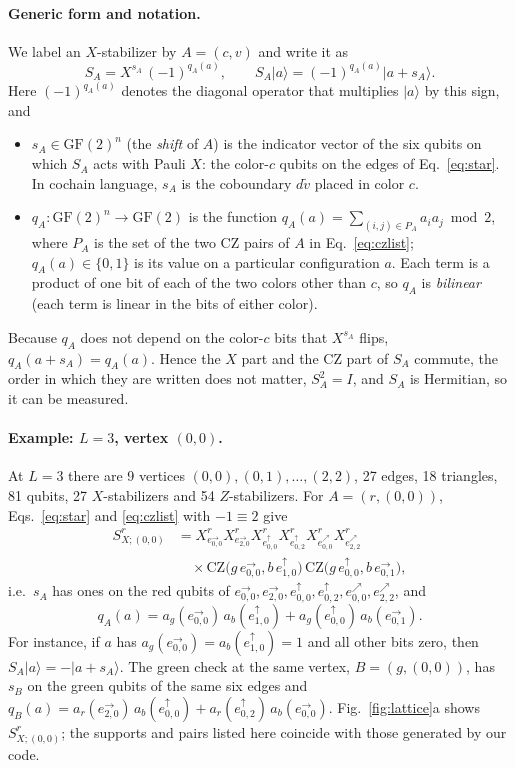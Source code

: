 \documentclass[a4paper]{article}
\newcommand{\rd}{r}
\newcommand{\gr}{g}
\newcommand{\bl}{b}
\newcommand{\GF}{\mathrm{GF}(2)}
\providecommand{\ket}[1]{\ensuremath{|#1\rangle}}
\newcommand{\eh}[1]{e^{\rightarrow}_{#1}}   %
\newcommand{\ev}[1]{e^{\uparrow}_{#1}}      %
\newcommand{\ed}[1]{e^{\nearrow}_{#1}}      %
\begin{document}
\paragraph{Generic form and notation.}
We label an $X$-stabilizer by $A=(c,v)$ and write it as
\begin{equation}
  S_A=X^{s_A}\,(-1)^{q_A(a)},\qquad S_A\ket{a}=(-1)^{q_A(a)}\ket{a+s_A}.
  \label{eq:generic}
\end{equation}
Here $(-1)^{q_A(a)}$ denotes the diagonal operator that multiplies $\ket{a}$ by this sign, and
\begin{itemize}[leftmargin=*,itemsep=0pt]
\item $s_A\in\GF^n$ (the \emph{shift} of $A$) is the indicator vector of the six qubits on which $S_A$ acts with Pauli $X$: the color-$c$ qubits on the edges of Eq.~\eqref{eq:star}. In cochain language, $s_A$ is the coboundary $d\tilde v$ placed in color $c$.
\item $q_A:\GF^n\to\GF$ is the function $q_A(a)=\sum_{(i,j)\in P_A}a_ia_j \bmod 2$, where $P_A$ is the set of the two CZ pairs of $A$ in Eq.~\eqref{eq:czlist}; $q_A(a)\in\{0,1\}$ is its value on a particular configuration $a$. Each term is a product of one bit of each of the two colors other than $c$, so $q_A$ is \emph{bilinear} (each term is linear in the bits of either color).
\end{itemize}
Because $q_A$ does not depend on the color-$c$ bits that $X^{s_A}$ flips, $q_A(a+s_A)=q_A(a)$. Hence the $X$ part and the CZ part of $S_A$ commute, the order in which they are written does not matter, $S_A^2=I$, and $S_A$ is Hermitian, so it can be measured.

\paragraph{Example: $L=3$, vertex $(0,0)$.}
At $L=3$ there are 9 vertices $(0,0),(0,1),\dots,(2,2)$, 27 edges, 18 triangles, 81 qubits, 27 $X$-stabilizers and 54 $Z$-stabilizers. For $A=(\rd,(0,0))$, Eqs.~\eqref{eq:star} and \eqref{eq:czlist} with $-1\equiv2$ give
\begin{align}
  S^\rd_{X;(0,0)}&=X^\rd_{\eh{0,0}}X^\rd_{\eh{2,0}}X^\rd_{\ev{0,0}}X^\rd_{\ev{0,2}}X^\rd_{\ed{0,0}}X^\rd_{\ed{2,2}}\nonumber\\
  &\quad\times\mathrm{CZ}\big(\gr\,\eh{0,0},\bl\,\ev{1,0}\big)\,\mathrm{CZ}\big(\gr\,\ev{0,0},\bl\,\eh{0,1}\big),
  \label{eq:example}
\end{align}
i.e.\ $s_A$ has ones on the red qubits of $\eh{0,0},\eh{2,0},\ev{0,0},\ev{0,2},\ed{0,0},\ed{2,2}$, and
\begin{equation}
  q_A(a)=a_\gr(\eh{0,0})\,a_\bl(\ev{1,0})+a_\gr(\ev{0,0})\,a_\bl(\eh{0,1}).
  \label{eq:qexample}
\end{equation}
For instance, if $a$ has $a_\gr(\eh{0,0})=a_\bl(\ev{1,0})=1$ and all other bits zero, then $S_A\ket{a}=-\ket{a+s_A}$. The green check at the same vertex, $B=(\gr,(0,0))$, has $s_B$ on the green qubits of the same six edges and $q_B(a)=a_\rd(\eh{2,0})\,a_\bl(\ev{0,0})+a_\rd(\ev{0,2})\,a_\bl(\eh{0,0})$. Fig.~\ref{fig:lattice}a shows $S^\rd_{X;(0,0)}$; the supports and pairs listed here coincide with those generated by our code.
\end{document}
